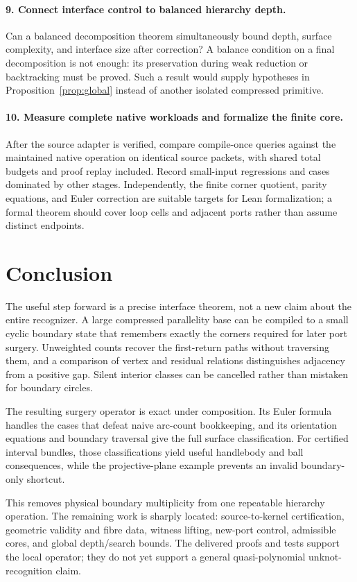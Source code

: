 \documentclass[11pt]{article}
\theoremstyle{definition}
\theoremstyle{remark}\newtheorem{remark}[theorem]{Remark}
\begin{document}
\paragraph{9. Connect interface control to balanced hierarchy depth.}
Can a balanced decomposition theorem simultaneously bound depth, surface complexity, and interface size after correction? A balance condition on a final decomposition is not enough: its preservation during weak reduction or backtracking must be proved. Such a result would supply hypotheses in Proposition~\ref{prop:global} instead of another isolated compressed primitive.

\paragraph{10. Measure complete native workloads and formalize the finite core.}
After the source adapter is verified, compare compile-once queries against the maintained native operation on identical source packets, with shared total budgets and proof replay included. Record small-input regressions and cases dominated by other stages. Independently, the finite corner quotient, parity equations, and Euler correction are suitable targets for Lean formalization; a formal theorem should cover loop cells and adjacent ports rather than assume distinct endpoints.

\section{Conclusion}
The useful step forward is a precise interface theorem, not a new claim about the entire recognizer. A large compressed parallelity base can be compiled to a small cyclic boundary state that remembers exactly the corners required for later port surgery. Unweighted counts recover the first-return paths without traversing them, and a comparison of vertex and residual relations distinguishes adjacency from a positive gap. Silent interior classes can be cancelled rather than mistaken for boundary circles.

The resulting surgery operator is exact under composition. Its Euler formula handles the cases that defeat naive arc-count bookkeeping, and its orientation equations and boundary traversal give the full surface classification. For certified interval bundles, those classifications yield useful handlebody and ball consequences, while the projective-plane example prevents an invalid boundary-only shortcut.

This removes physical boundary multiplicity from one repeatable hierarchy operation. The remaining work is sharply located: source-to-kernel certification, geometric validity and fibre data, witness lifting, new-port control, admissible cores, and global depth/search bounds. The delivered proofs and tests support the local operator; they do not yet support a general quasi-polynomial unknot-recognition claim.
\end{document}
